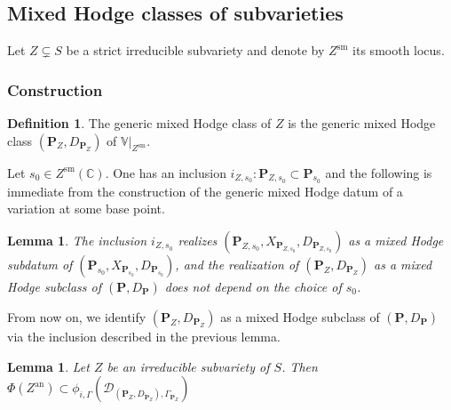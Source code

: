 \documentclass[10pt]{article}
\numberwithin{equation}{subsection}
\theoremstyle{plain}
\newtheorem{lemma}[theorem]{Lemma}
\theoremstyle{definition}
\newtheorem{definition}[theorem]{Definition}
\theoremstyle{remark}
\newcommand{\C}{\mathbb C}
\newcommand{\V}{\mathbb V}
\newcommand{\sm}{\mathrm{sm}}
\newcommand{\pp}{\mathbf P}
\newcommand{\an}{\mathrm{an}}
\newcommand{\period}{\mathscr{D}}
\begin{document}
\subsection{Mixed Hodge classes of subvarieties}
Let $Z \subsetneq S$ be a strict irreducible subvariety and denote by $Z^\sm$ its smooth locus.
\subsubsection*{Construction}
\begin{definition}
The generic mixed Hodge class of $Z$ is the generic mixed Hodge class $(\pp_Z, D_{\pp_Z})$ of $\V\vert_{Z^\sm}$.
\end{definition}
Let $s_0 \in Z^\sm(\C)$. One has an inclusion $i_{Z,s_0} : \pp_{Z,s_0} \subset \pp_{s_0}$ and the following is immediate from the construction of the generic mixed Hodge datum of a variation at some base point.
\begin{lemma}\label{min}
The inclusion $i_{Z,s_0}$ realizes $(\pp_{Z,s_0}, X_{\pp_{Z,s_0}}, D_{\pp_{Z,s_0}})$ as a mixed Hodge subdatum of $(\pp_{s_0}, X_{\pp_{s_0}}, D_{\pp_{s_0}})$, and the realization of $(\pp_Z, D_{\pp_Z})$ as a mixed Hodge subclass of $(\pp, D_\pp)$ does not depend on the choice of $s_0$.
\end{lemma}
From now on, we identify $(\pp_Z, D_{\pp_Z})$ as a mixed Hodge subclass of $(\pp, D_\pp)$ via the inclusion described in the previous lemma.
\begin{lemma}\label{minsubv}
Let $Z$ be an irreducible subvariety of $S$. Then $\Phi(Z^\an) \subset \phi_{i, \Gamma}(\period_{(\pp_Z, D_{\pp_Z}), \Gamma_{\pp_Z}})$
\end{lemma}
\end{document}
